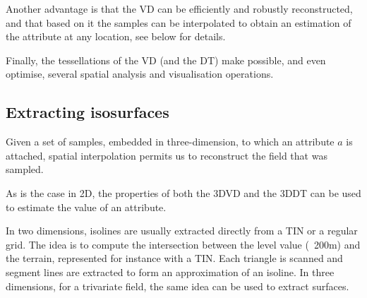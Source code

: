 Another advantage is that the VD can be efficiently and robustly reconstructed, and that based on it the samples can be interpolated to obtain an estimation of the attribute at any location, see below for details.

Finally, the tessellations of the VD (and the DT) make possible, and even optimise, several spatial analysis and visualisation operations.

\subsection{Extracting isosurfaces}%
\label{sec:interpol}

Given a set of samples, embedded in three-dimension, to which an attribute $a$ is attached, spatial interpolation permits us to reconstruct the field that was sampled.

As is the case in 2D, the properties of both the 3DVD and the 3DDT can be used to estimate the value of an attribute.

In two dimensions, isolines are usually extracted directly from a TIN or a regular grid. 
The idea is to compute the intersection between the level value (\eg\ 200m) and the terrain, represented for instance with a TIN\@. 
Each triangle is scanned and segment lines are extracted to form an approximation of an isoline.
In three dimensions, for a trivariate field, the same idea can be used to extract surfaces.

